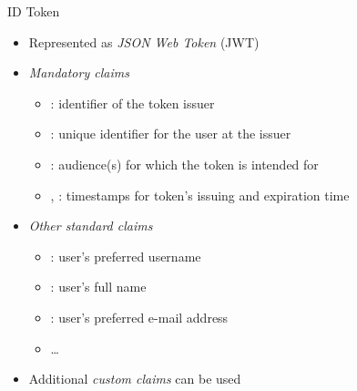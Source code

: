 \documentclass[aspectratio=169]{beamer}
\begin{document}
\begin{frame}{ID Token}
	\vspace*{1em}
	\begin{itemize}
		\item Represented as \emph{JSON Web Token} (JWT) \cite{RFC7519}
		\item \emph{Mandatory claims}
		\begin{itemize}
			\item {}: identifier of the token issuer \hfill {}
			\item {}: unique identifier for the user at the issuer \hfill {}
			\item {}: audience(s) for which the token is intended for \hfill {}
			\item {}, : timestamps for token's issuing and expiration time \hfill {}
		\end{itemize}
		\item \emph{Other standard claims}
		\begin{itemize}
			\item {}: user's preferred username \hfill {}
			\item {}: user's full name \hfill {}
			\item {}: user's preferred e-mail address \hfill {}
			\item \dots
		\end{itemize}
		\item Additional \emph{custom claims} can be used
	\end{itemize}
	\vspace*{-1em}
\end{frame}
\end{document}
